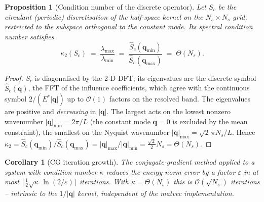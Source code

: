 \documentclass[11pt,a4paper]{article}
\newcommand{\Es}{E^{*}}
\newcommand{\Order}{\mathcal{O}}
\newcommand{\abs}[1]{\left\lvert #1 \right\rvert}
\newtheorem{proposition}{Proposition}
\newtheorem{corollary}{Corollary}
\theoremstyle{definition}
\theoremstyle{remark}
\begin{document}
\begin{proposition}[Condition number of the discrete operator]
\label{prop:cond}
Let $S_c$ be the circulant (periodic) discretisation of the half-space kernel on
the $N_s\times N_s$ grid, restricted to the subspace orthogonal to the constant
mode. Its spectral condition number satisfies
\begin{equation}
  \kappa_2(S_c) \;=\; \frac{\lambda_{\max}}{\lambda_{\min}}
  \;=\; \frac{\widehat S_c(\mathbf q_{\min})}{\widehat S_c(\mathbf q_{\max})}
  \;=\; \Theta(N_s).
  \label{eq:kappa}
\end{equation}
\end{proposition}
\begin{proof}
$S_c$ is diagonalised by the 2-D DFT; its eigenvalues are the discrete symbol
$\widehat S_c(\mathbf q)$, the FFT of the influence coefficients, which agree with
the continuous symbol $2/(\Es\abs{\mathbf q})$ up to $\Order(1)$ factors on the
resolved band. The eigenvalues are positive and \emph{decreasing} in
$\abs{\mathbf q}$. The largest acts on the lowest nonzero wavenumber
$\abs{\mathbf q}_{\min}=2\pi/L$ (the constant mode $\mathbf q=0$ is excluded by the
mean constraint), the smallest on the Nyquist wavenumber
$\abs{\mathbf q}_{\max}=\sqrt2\,\pi N_s/L$. Hence
$\kappa_2 = \widehat S_c(\mathbf q_{\min})/\widehat S_c(\mathbf q_{\max})
= \abs{\mathbf q}_{\max}/\abs{\mathbf q}_{\min} = \tfrac{\sqrt2}{2}N_s=\Theta(N_s)$.
\end{proof}

\begin{corollary}[CG iteration growth]
\label{cor:cg}
The conjugate-gradient method applied to a system with condition number $\kappa$
reduces the energy-norm error by a factor $\varepsilon$ in at most
$\big\lceil \tfrac12\sqrt{\kappa}\,\ln(2/\varepsilon)\big\rceil$ iterations. With
$\kappa=\Theta(N_s)$ this is $\Order(\sqrt{N_s})$ iterations -- intrinsic to the
$1/\abs{\mathbf q}$ kernel, independent of the matvec implementation.
\end{corollary}
\end{document}
